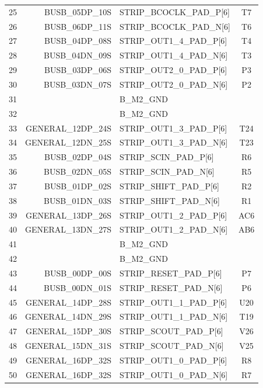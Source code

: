 \documentclass[11pt]{article}
\begin{document}
\begin{table}
\begin{center}
\begin{tabular}{|c|r|l|c|}
25 &  BUSB\_05DP\_10S & STRIP\_BCOCLK\_PAD\_P[6] &   T7 \\
26 &  BUSB\_06DP\_11S & STRIP\_BCOCLK\_PAD\_N[6] &   T6 \\ \hline
27 &  BUSB\_04DP\_08S & STRIP\_OUT1\_4\_PAD\_P[6] &   T4 \\
28 &  BUSB\_04DN\_09S & STRIP\_OUT1\_4\_PAD\_N[6] &   T3 \\ \hline
29 &  BUSB\_03DP\_06S & STRIP\_OUT2\_0\_PAD\_P[6] &   P3 \\
30 &  BUSB\_03DN\_07S & STRIP\_OUT2\_0\_PAD\_N[6] &   P2 \\ \hline
31 &                & B\_M2\_GND & \\
32 &                & B\_M2\_GND & \\ \hline
33 & GENERAL\_12DP\_24S & STRIP\_OUT1\_3\_PAD\_P[6]  &  T24 \\
34 & GENERAL\_12DN\_25S & STRIP\_OUT1\_3\_PAD\_N[6]  &  T23 \\ \hline
35 &  BUSB\_02DP\_04S & STRIP\_SCIN\_PAD\_P[6]      & R6 \\
36 &  BUSB\_02DN\_05S & STRIP\_SCIN\_PAD\_N[6]    &   R5 \\ \hline
37 &  BUSB\_01DP\_02S & STRIP\_SHIFT\_PAD\_P[6]     & R2 \\
38 &  BUSB\_01DN\_03S & STRIP\_SHIFT\_PAD\_N[6]   &   R1 \\ \hline
39 & GENERAL\_13DP\_26S & STRIP\_OUT1\_2\_PAD\_P[6]     &AC6 \\
40 & GENERAL\_13DN\_27S & STRIP\_OUT1\_2\_PAD\_N[6]   &  AB6 \\ \hline
41 &                  & B\_M2\_GND & \\
42 &                  & B\_M2\_GND & \\ \hline
43 &  BUSB\_00DP\_00S   &  STRIP\_RESET\_PAD\_P[6]  &  P7 \\
44 &  BUSB\_00DN\_01S   &  STRIP\_RESET\_PAD\_N[6]  &  P6 \\ \hline
45 & GENERAL\_14DP\_28S   &  STRIP\_OUT1\_1\_PAD\_P[6] &  U20 \\
46 & GENERAL\_14DN\_29S   &  STRIP\_OUT1\_1\_PAD\_N[6] &  T19 \\ \hline
47 & GENERAL\_15DP\_30S   &  STRIP\_SCOUT\_PAD\_P[6]  &  V26 \\
48 & GENERAL\_15DN\_31S   &  STRIP\_SCOUT\_PAD\_N[6]  &  V25 \\ \hline
49 & GENERAL\_16DP\_32S   &  STRIP\_OUT1\_0\_PAD\_P[6] &  R8 \\
50 & GENERAL\_16DP\_32S   &  STRIP\_OUT1\_0\_PAD\_N[6] &  R7 \\ \hline
\end{tabular}
\end{center}
\end{table}
\end{document}
